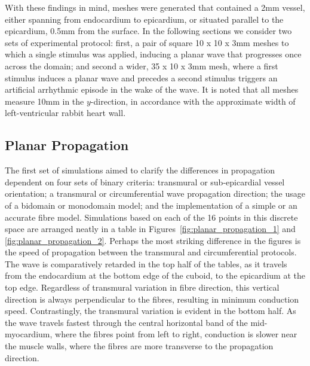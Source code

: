   With these findings in mind, meshes were generated that contained a 2mm vessel, either spanning from endocardium to epicardium, or situated parallel to the epicardium, 0.5mm from the surface. In the following sections we consider two sets of experimental protocol: first, a pair of square 10 x 10 x 3mm meshes to which a single stimulus was applied, inducing a planar wave that progresses once across the domain; and second a wider, 35 x 10 x 3mm mesh, where a first stimulus induces a planar wave and precedes a second stimulus triggers an artificial arrhythmic episode in the wake of the wave. It is noted that all meshes measure 10mm in the $y$-direction, in accordance with the approximate width of left-ventricular rabbit heart wall.
    
  \subsection{Planar Propagation} %
  \label{sub:planar_propagation}
    The first set of simulations aimed to clarify the differences in propagation dependent on four sets of binary criteria: transmural or sub-epicardial vessel orientation; a transmural or circumferential wave propagation direction; the usage of a bidomain or monodomain model; and the implementation of a simple or an accurate fibre model. Simulations based on each of the 16 points in this discrete space are arranged neatly in a table in Figures~\ref{fig:planar_propagation_1} and \ref{fig:planar_propagation_2}. Perhaps the most striking difference in the figures is the speed of propagation between the transmural and circumferential protocols. The wave is comparatively retarded in the top half of the tables, as it travels from the endocardium at the bottom edge of the cuboid, to the epicardium at the top edge. Regardless of transmural variation in fibre direction, this vertical direction is always perpendicular to the fibres, resulting in minimum conduction speed. Contrastingly, the transmural variation is evident in the bottom half. As the wave travels fastest through the central horizontal band of the mid-myocardium, where the fibres point from left to right, conduction is slower near the muscle walls, where the fibres are more transverse to the propagation direction.
    

